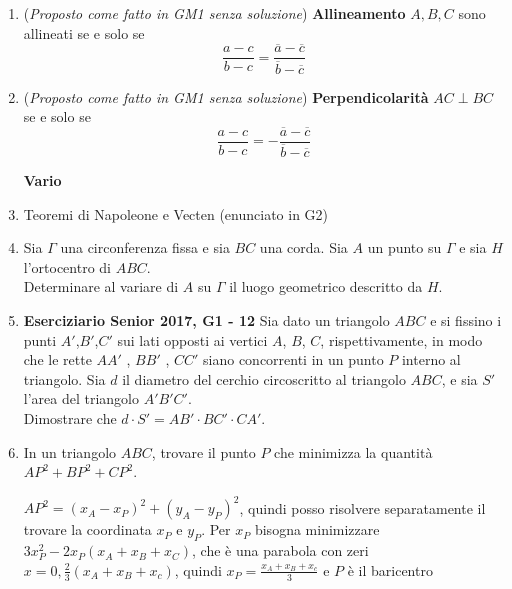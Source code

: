 \begin{enumerate}
\item (\emph{Proposto come fatto in GM1 senza soluzione}) \textbf{Allineamento} $A,B,C$ sono allineati se e solo se 
$$\frac{a-c}{b-c}=\frac{\overline{a}-\overline{c}}{\overline{b}-\overline{c}}$$

\item (\emph{Proposto come fatto in GM1 senza soluzione}) \textbf{Perpendicolarità} $AC\perp BC$ se e solo se 
$$\frac{a-c}{b-c}= - \frac{\overline{a}-\overline{c}}{\overline{b}-\overline{c}}$$




\textbf{Vario}

\item Teoremi di Napoleone e Vecten (enunciato in G2)

\item Sia $\Gamma$ una circonferenza fissa e sia $BC$ una corda. Sia $A$ un punto su $\Gamma$ e sia $H$ l'ortocentro di $ABC$.\\
Determinare al variare di $A$ su $\Gamma$ il luogo geometrico descritto da $H$.

\item \textbf{Eserciziario Senior 2017, G1 - 12} Sia dato un triangolo $ABC$ e si fissino i punti $A'$,$B'$,$C'$ sui lati opposti ai vertici $A$, $B$,
$C$, rispettivamente, in modo che le rette $AA'$ , $BB'$ , $CC'$ siano concorrenti in un punto $P$ interno al triangolo. Sia $d$ il diametro del cerchio circoscritto al triangolo $ABC$, e sia $S'$ l’area del triangolo $A'B'C'$.\\
Dimostrare che $d \cdot S' = AB'\cdot BC'\cdot CA'$.

\item In un triangolo $ABC$, trovare il punto $P$ che minimizza la quantità $AP^2+BP^2+CP^2$.

\begin{sol}
 $AP^2=(x_A-x_P)^2+(y_A-y_P)^2$, quindi posso risolvere separatamente il trovare la coordinata $x_P$ e $y_P$. 
 Per $x_P$ bisogna minimizzare $3x_P^2-2x_P(x_A+x_B+x_C)$, che è una parabola con zeri $x=0, \frac{2}{3}(x_A+x_B+x_c)$, quindi $x_P=\frac{x_A+x_B+x_c}{3}$ e $P$ è il baricentro
\end{sol}



\end{enumerate}


